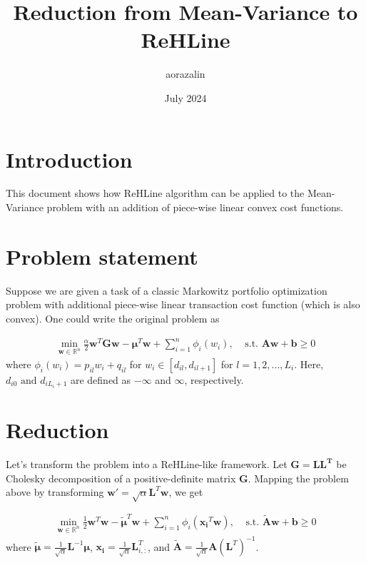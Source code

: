 \documentclass{article}
\title{Reduction from Mean-Variance to ReHLine}
\author{aorazalin }
\date{July 2024}
\newcommand{\R}{\mathbb{R}}
\newcommand*{\V}[1]{\mathbf{#1}}
\begin{document}
\maketitle

\section{Introduction}
This document shows how ReHLine algorithm can be applied to the Mean-Variance problem with an addition of piece-wise linear convex cost functions.

\section{Problem statement}
Suppose we are given a task of a classic Markowitz portfolio optimization problem with additional piece-wise linear transaction cost function (which is also convex). One could write the original problem as

\begin{align*}
\min_{\mathbf{w} \in \R^n} \frac{\alpha}{2} \mathbf{w}^T \mathbf{G} \mathbf{w} - \mathbf{\mu}^T \mathbf{w} + \sum_{i=1}^n \phi_i(w_i), \; \; \; \; \text{s.t. } \mathbf{A w} + \mathbf{b} \geq 0
\end{align*}
where $\phi_i(w_i) = p_{il} w_i + q_{il}$ for $w_i \in [d_{il}, d_{il+1}]$ for $l=1,2,...,L_i$. Here, $d_{i0} \text{ and } d_{iL_i+1}$ are defined as $-\infty$ and $\infty$, respectively. 

\section{Reduction}
Let's transform the problem into a ReHLine-like framework. Let $\mathbf{G =LL^T}$ be Cholesky decomposition of a positive-definite matrix $\mathbf{G}$. Mapping the problem above by transforming $\mathbf{w}' = \sqrt{\alpha} \mathbf{L}^T\mathbf{w}$, we get

\begin{align*}
\min_{\mathbf{w} \in \R^n} \frac{1}{2} \mathbf{w}^T \mathbf{w} - \mathbf{\tilde{\mu}}^T \mathbf{w} + \sum_{i=1}^n \phi_i(\mathbf{x_i}^T \mathbf{w}), \;\;\;\; \text{s.t. } \mathbf{\tilde{A}w} + \mathbf{b} \geq 0
\end{align*}
where $\mathbf{\tilde{\mu}} = \frac{1}{\sqrt{\alpha}} \mathbf{L}^{-1} \mathbf{\mu}$, 
$\mathbf{x_i} = \frac{1}{\sqrt{\alpha}} \V{L}^T_{i,:}$, 
and $\tilde{\mathbf{A}} = \frac{1}{\sqrt{\alpha}} \mathbf{A} (\V{L}^T)^{-1}$.
\end{document}

